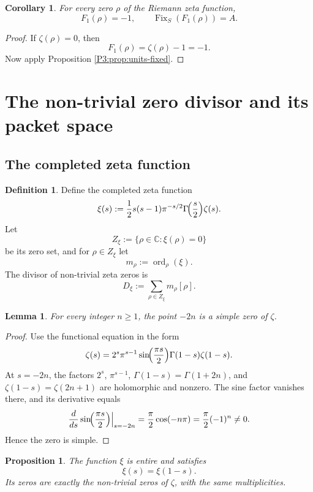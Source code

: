 \documentclass[11pt,a4paper]{article}
\numberwithin{equation}{section}
\newtheorem{proposition}[theorem]{Proposition}
\newtheorem{lemma}[theorem]{Lemma}
\newtheorem{corollary}[theorem]{Corollary}
\theoremstyle{definition}
\newtheorem{definition}[theorem]{Definition}
\theoremstyle{remark}
\DeclareMathOperator{\Fix}{Fix}
\DeclareMathOperator{\ord}{ord}
\newcommand{\CC}{\mathbb C}
\begin{document}
\begin{corollary}\label{P3:cor:F1-zero}
For every zero $\rho$ of the Riemann zeta function,
\[
F_1(\rho)=-1,
\qquad
\Fix_S(F_1(\rho))=A.
\]
\end{corollary}

\begin{proof}
If $\zeta(\rho)=0$, then
\[
F_1(\rho)=\zeta(\rho)-1=-1.
\]
Now apply Proposition \ref{P3:prop:units-fixed}.
\end{proof}

\section{The non-trivial zero divisor and its packet space}

\subsection{The completed zeta function}

\begin{definition}
Define the completed zeta function
\[
\xi(s):=\frac12 s(s-1)\pi^{-s/2}\Gamma\!\Bigl(\frac s2\Bigr)\zeta(s).
\]
Let
\[
Z_\xi:=\{\rho\in\CC:\xi(\rho)=0\}
\]
be its zero set, and for $\rho\in Z_\xi$ let
\[
m_\rho:=\ord_\rho(\xi).
\]
The divisor of non-trivial zeta zeros is
\[
D_\xi:=\sum_{\rho\in Z_\xi} m_\rho[\rho].
\]
\end{definition}

\begin{lemma}\label{P3:lem:trivial-simple}
For every integer $n\ge 1$, the point $-2n$ is a simple zero of $\zeta$.
\end{lemma}

\begin{proof}
Use the functional equation in the form
\[
\zeta(s)=2^s\pi^{s-1}\sin\!\Bigl(\frac{\pi s}{2}\Bigr)\Gamma(1-s)\zeta(1-s).
\]
At $s=-2n$, the factors $2^s$, $\pi^{s-1}$, $\Gamma(1-s)=\Gamma(1+2n)$, and $\zeta(1-s)=\zeta(2n+1)$ are holomorphic and nonzero.  The sine factor vanishes there, and its derivative equals
\[
\frac{d}{ds}\sin\!\Bigl(\frac{\pi s}{2}\Bigr)\Big|_{s=-2n}
=\frac{\pi}{2}\cos(-n\pi)
=\frac{\pi}{2}(-1)^n\neq 0.
\]
Hence the zero is simple.
\end{proof}

\begin{proposition}\label{P3:prop:xi-entire}
The function $\xi$ is entire and satisfies
\[
\xi(s)=\xi(1-s).
\]
Its zeros are exactly the non-trivial zeros of $\zeta$, with the same multiplicities.
\end{proposition}
\end{document}
